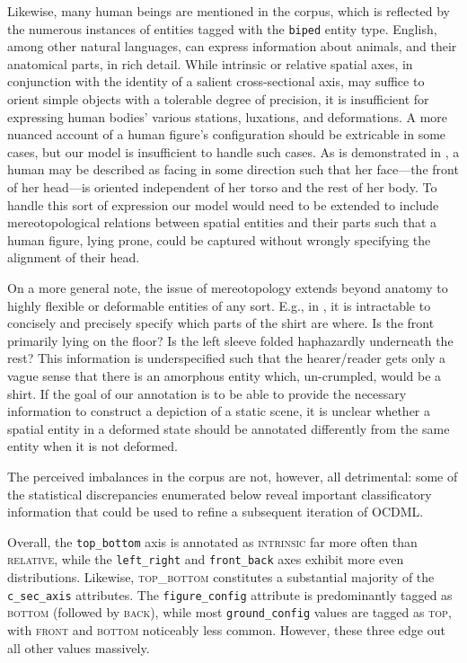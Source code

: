\documentclass[11pt]{article}
\begin{document}
Likewise, many human beings are mentioned in the corpus, which is reflected by the numerous instances of entities tagged with the \texttt{biped} entity type. English, among other natural languages, can express information about animals, and their anatomical parts, in rich detail. While intrinsic or relative spatial axes, in conjunction with the identity of a salient cross-sectional axis, may suffice to orient simple objects with a tolerable degree of precision, it is insufficient for expressing human bodies' various stations, luxations, and deformations. A more nuanced account of a human figure's configuration should be extricable in some cases, but our model is insufficient to handle such cases. As is demonstrated in , a human may be described as facing in some direction such that her face---the front of her head---is oriented independent of her torso and the rest of her body. To handle this sort of expression our model would need to be extended to include mereotopological relations between spatial entities and their parts such that a human figure, lying prone, could be captured without wrongly specifying the alignment of their head.


On a more general note, the issue of mereotopology extends beyond anatomy to highly flexible or deformable entities of any sort. E.g., in , it is intractable to concisely and precisely specify which parts of the shirt are where. Is the front primarily lying on the floor? Is the left sleeve folded haphazardly underneath the rest? This information is underspecified such that the hearer/reader gets only a vague sense that there is an amorphous entity which, un-crumpled, would be a shirt. If the goal of our annotation is to be able to provide the necessary information to construct a depiction of a static scene, it is unclear whether a spatial entity in a deformed state should be annotated differently from the same entity when it is not deformed.

The perceived imbalances in the corpus are not, however, all detrimental: some of the statistical discrepancies enumerated below reveal important classificatory information that could be used to refine a subsequent iteration of OCDML.

Overall, the \texttt{top\_bottom} axis is annotated as \textsc{intrinsic} far more often than \textsc{relative}, while the \texttt{left\_right} and \texttt{front\_back} axes exhibit more even distributions. Likewise, \textsc{top\_bottom} constitutes a substantial majority of the \texttt{c\_sec\_axis} attributes. The \texttt{figure\_config} attribute is predominantly tagged as \textsc{bottom} (followed by \textsc{back}), while most \texttt{ground\_config} values are tagged as \textsc{top}, with \textsc{front} and \textsc{bottom} noticeably less common. However, these three edge out all other values massively.
\end{document}
